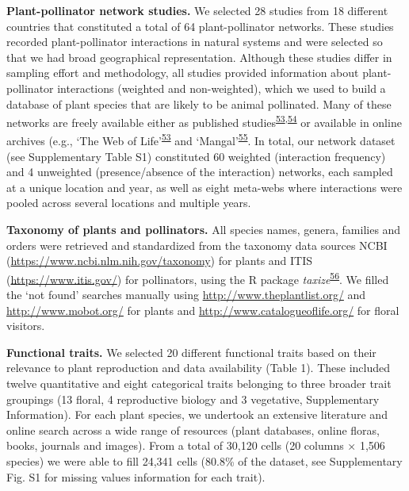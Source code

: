 \documentclass[12pt,a4paper,]{article}
\begin{document}
\textbf{Plant-pollinator network studies.} We selected 28 studies from
18 different countries that constituted a total of 64 plant-pollinator
networks. These studies recorded plant-pollinator interactions in
natural systems and were selected so that we had broad geographical
representation. Although these studies differ in sampling effort and
methodology, all studies provided information about plant-pollinator
interactions (weighted and non-weighted), which we used to build a
database of plant species that are likely to be animal pollinated. Many
of these networks are freely available either as published
studies\textsuperscript{\protect\hyperlink{ref-fortuna2010}{53},\protect\hyperlink{ref-carvalheiro2014}{54}}
or available in online archives (e.g., `The Web of
Life'\textsuperscript{\protect\hyperlink{ref-fortuna2010}{53}} and
`Mangal'\textsuperscript{\protect\hyperlink{ref-poisot2016}{55}}. In
total, our network dataset (see Supplementary Table S1) constituted 60
weighted (interaction frequency) and 4 unweighted (presence/absence of
the interaction) networks, each sampled at a unique location and year,
as well as eight meta-webs where interactions were pooled across several
locations and multiple years.

\textbf{Taxonomy of plants and pollinators.} All species names, genera,
families and orders were retrieved and standardized from the taxonomy
data sources NCBI (\url{https://www.ncbi.nlm.nih.gov/taxonomy}) for
plants and ITIS (\url{https://www.itis.gov/}) for pollinators, using the
R package
\emph{taxize}\textsuperscript{\protect\hyperlink{ref-chamberlain2020}{56}}.
We filled the `not found' searches manually using
\url{http://www.theplantlist.org/} and \url{http://www.mobot.org/} for
plants and \url{http://www.catalogueoflife.org/} for floral visitors.

\textbf{Functional traits.} We selected 20 different functional traits
based on their relevance to plant reproduction and data availability
(Table 1). These included twelve quantitative and eight categorical
traits belonging to three broader trait groupings (13 floral, 4
reproductive biology and 3 vegetative, Supplementary Information). For
each plant species, we undertook an extensive literature and online
search across a wide range of resources (plant databases, online floras,
books, journals and images). From a total of 30,120 cells (20 columns ×
1,506 species) we were able to fill 24,341 cells (80.8\% of the dataset,
see Supplementary Fig. S1 for missing values information for each
trait).
\end{document}
